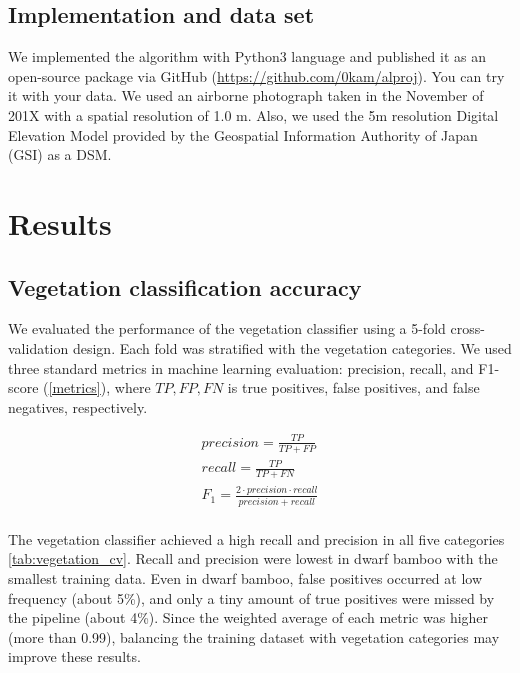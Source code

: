 \documentclass{article}
\begin{document}
\hypertarget{implementation-and-data-set}{%
\subsection{Implementation and data set}\label{implementation-and-data-set}}

We implemented the algorithm with Python3 language and published it as an open-source package via GitHub (\url{https://github.com/0kam/alproj}). You can try it with your data. We used an airborne photograph taken in the November of 201X with a spatial resolution of 1.0 m. Also, we used the 5m resolution Digital Elevation Model provided by the Geospatial Information Authority of Japan (GSI) as a DSM.

\hypertarget{results}{%
\section{Results}\label{results}}

\hypertarget{vegetation-classification-accuracy}{%
\subsection{Vegetation classification accuracy}\label{vegetation-classification-accuracy}}

We evaluated the performance of the vegetation classifier using a 5-fold cross-validation design. Each fold was stratified with the vegetation categories. We used three standard metrics in machine learning evaluation: precision, recall, and F1-score (\ref{metrics}), where \(TP, FP, FN\) is true positives, false positives, and false negatives, respectively.

\begin{align}
\label{metrics}
precision = \frac{TP}{TP + FP} \\
recall = \frac{TP}{TP + FN} \\
F_1 = \frac{2 \cdot precision \cdot recall}{precision + recall} \\
\end{align}

The vegetation classifier achieved a high recall and precision in all five categories \ref{tab:vegetation_cv}. Recall and precision were lowest in dwarf bamboo with the smallest training data. Even in dwarf bamboo, false positives occurred at low frequency (about 5\%), and only a tiny amount of true positives were missed by the pipeline (about 4\%). Since the weighted average of each metric was higher (more than 0.99), balancing the training dataset with vegetation categories may improve these results.
\end{document}
